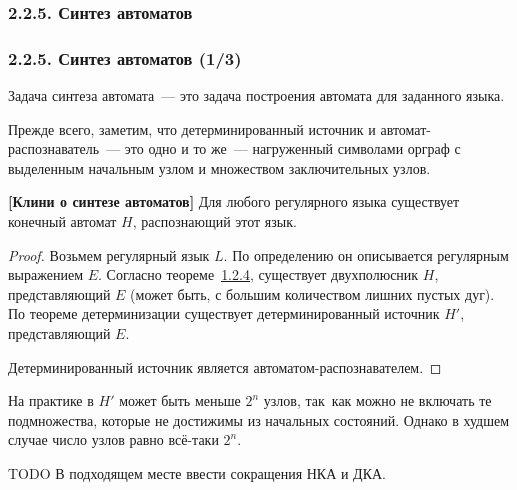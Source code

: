 \documentclass[mathserif,12pt,aspectratio=169]{beamer}
\def\NB#1{{\bf\color{brown}#1}}
\def\DMref#1#2{{\color{blue}\underline{\hyperlink{#2}{#1}}}}
\def\TODO#1{{\color{gray} TODO {#1}}}
\begin{document}
\subsubsection{2.2.5. Синтез автоматов}
\begin{frame}
\frametitle{2.2.5. Синтез автоматов (1/3)}
Задача синтеза автомата~--- это задача построения автомата для заданного
языка.

Прежде всего, заметим,
что детерминированный источник и автомат-распознаватель~--- это
одно и то же~--- нагруженный символами орграф с выделенным начальным
узлом и множеством заключительных узлов.

\begin{theorem} {\NB{[Клини о синтезе автоматов]}}
Для любого регулярного языка существует конечный автомат $H$,
распознающий этот язык.
\end{theorem}

\begin{proof}
Возьмем регулярный язык $L$. По определению он описывается
регулярным выражением $E$. Согласно теореме~\DMref{1.2.4}{1.2.4.}, существует
двухполюсник $H$, представляющий $E$ (может быть, с большим
количеством лишних пустых дуг). По теореме
детерминизации существует
 детерминированный источник $H'$, представляющий $E$.

Детерминированный источник является 
автоматом-распознавателем.
\end{proof}

\begin{remark}
На практике в $H'$ может быть меньше $2^n$  узлов, так~как можно не
включать те подмножества, которые не достижимы из начальных
состояний. Однако в худшем случае число узлов равно всё-таки $2^n$.
\end{remark}

\TODO{В подходящем месте ввести сокращения НКА и ДКА.}
\end{frame}
\end{document}
